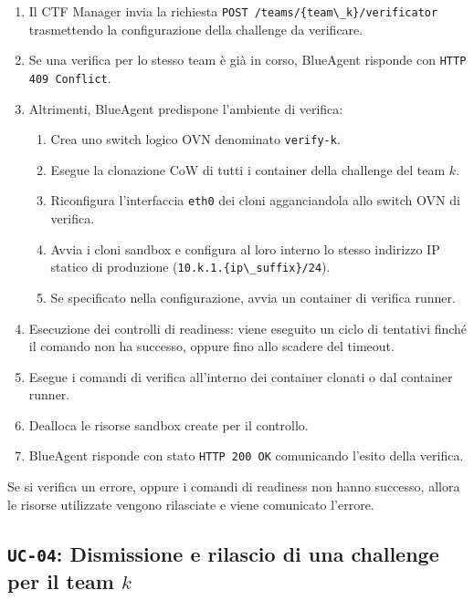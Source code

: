 \begin{enumerate}
\def\labelenumi{\arabic{enumi}.}
\tightlist
\item
  Il CTF Manager invia la richiesta
  \passthrough{\lstinline!POST /teams/\{team\_k\}/verificator!}
  trasmettendo la configurazione della challenge da verificare.
\item
  Se una verifica per lo stesso team è già in corso, BlueAgent risponde
  con \passthrough{\lstinline!HTTP 409 Conflict!}.
\item
  Altrimenti, BlueAgent predispone l'ambiente di verifica:

  \begin{enumerate}
  \def\labelenumii{\arabic{enumii}.}
  \tightlist
  \item
    Crea uno switch logico OVN denominato
    \passthrough{\lstinline!verify-k!}.
  \item
    Esegue la clonazione CoW di tutti i container della challenge del
    team \(k\).
  \item
    Riconfigura l'interfaccia \passthrough{\lstinline!eth0!} dei cloni
    agganciandola allo switch OVN di verifica.
  \item
    Avvia i cloni sandbox e configura al loro interno lo stesso
    indirizzo IP statico di produzione
    (\passthrough{\lstinline!10.k.1.\{ip\_suffix\}/24!}).
  \item
    Se specificato nella configurazione, avvia un container di verifica
    runner.
  \end{enumerate}
\item
  Esecuzione dei controlli di readiness: viene eseguito un ciclo di
  tentativi finché il comando non ha successo, oppure fino allo scadere
  del timeout.
\item
  Esegue i comandi di verifica all'interno dei container clonati o dal
  container runner.
\item
  Dealloca le risorse sandbox create per il controllo.
\item
  BlueAgent risponde con stato \passthrough{\lstinline!HTTP 200 OK!}
  comunicando l'esito della verifica.
\end{enumerate}

Se si verifica un errore, oppure i comandi di readiness non hanno
successo, allora le risorse utilizzate vengono rilasciate e viene
comunicato l'errore.

\subsection{\texorpdfstring{\texttt{UC-04}: Dismissione e rilascio di
una challenge per il team
\(k\)}{UC-04: Dismissione e rilascio di una challenge per il team k}}\label{uc-04-dismissione-e-rilascio-di-una-challenge-per-il-team-k}

